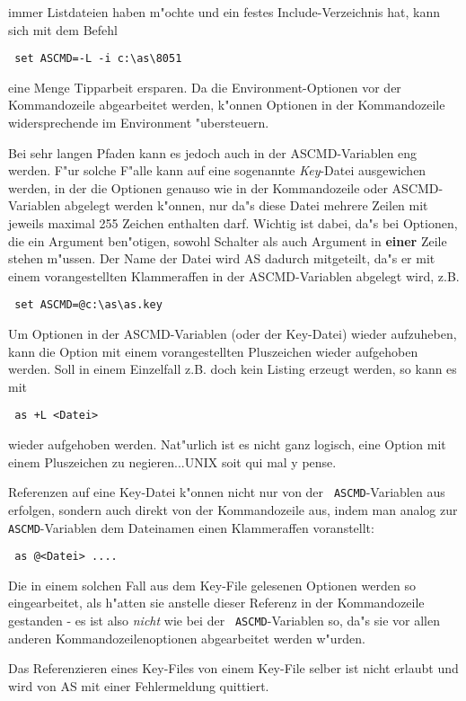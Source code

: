 \documentclass[12pt,a4paper,twoside]{report}
\newcommand{\ii}[1]{{\it #1}}
\newcommand{\bb}[1]{{\bf #1}}
\begin{document}
immer Listdateien haben m"ochte und ein festes Include-Verzeichnis hat,
kann sich mit dem Befehl
\begin{verbatim}
 set ASCMD=-L -i c:\as\8051
\end{verbatim}
eine Menge Tipparbeit ersparen.  Da die Environment-Optionen vor der
Kommandozeile abgearbeitet werden, k"onnen Optionen in der
Kommandozeile widersprechende im Environment "ubersteuern.
\par
Bei sehr langen Pfaden kann es jedoch auch in der ASCMD-Variablen eng
werden.  F"ur solche F"alle kann auf eine sogenannte \ii{Key}-Datei
ausgewichen werden, in der die Optionen genauso wie in der Kommandozeile
oder ASCMD-Variablen abgelegt werden k"onnen, nur da"s diese Datei
mehrere Zeilen mit jeweils maximal 255 Zeichen enthalten darf.  Wichtig
ist dabei, da"s bei Optionen, die ein Argument ben"otigen, sowohl Schalter
als auch Argument in \bb{einer} Zeile stehen m"ussen.  Der Name der
Datei wird AS dadurch mitgeteilt, da"s er mit einem vorangestellten
Klammeraffen in der ASCMD-Variablen abgelegt wird, z.B.
\begin{verbatim}
 set ASCMD=@c:\as\as.key
\end{verbatim}
Um Optionen in der ASCMD-Variablen (oder der Key-Datei) wieder aufzuheben,
kann die Option mit einem vorangestellten Pluszeichen wieder aufgehoben
werden.  Soll in einem Einzelfall z.B. doch kein Listing erzeugt werden,
so kann es mit
\begin{verbatim}
 as +L <Datei>
\end{verbatim}
wieder aufgehoben werden.  Nat"urlich ist es nicht ganz logisch, eine
Option mit einem Pluszeichen zu negieren...UNIX soit qui mal y pense.
\par
Referenzen auf eine Key-Datei k"onnen nicht nur von der {\tt
ASCMD}-Variablen aus erfolgen, sondern auch direkt von der Kommandozeile
aus, indem man analog zur {\tt ASCMD}-Variablen dem Dateinamen einen
Klammeraffen voranstellt:
\begin{verbatim}
 as @<Datei> ....
\end{verbatim}
Die in einem solchen Fall aus dem Key-File gelesenen Optionen werden so
eingearbeitet, als h"atten sie anstelle dieser Referenz in der
Kommandozeile gestanden - es ist also {\em nicht} wie bei der {\tt
ASCMD}-Variablen so, da"s sie vor allen anderen Kommandozeilenoptionen
abgearbeitet werden w"urden.
\par
Das Referenzieren eines Key-Files von einem Key-File selber ist nicht
erlaubt und wird von AS mit einer Fehlermeldung quittiert.
\end{document}
